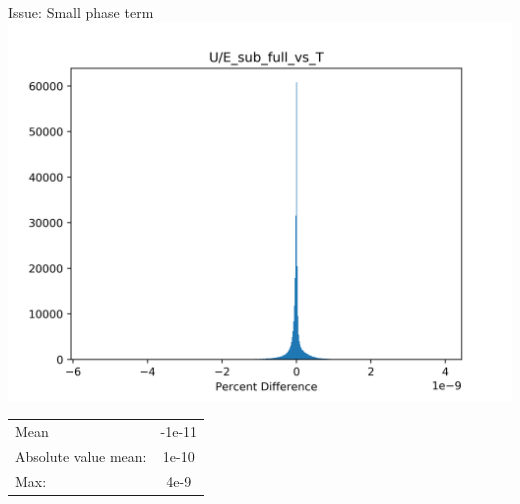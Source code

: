 \documentclass[presentation]{beamer}
\begin{document}
  \begin{frame}{Issue: Small phase term}
    \centering
    \includegraphics[width=0.8\linewidth]{figs/esub}

    \begin{tabular}{l | c }
    Mean & -1e-11\\
    Absolute value mean: & 1e-10\\
    Max: & 4e-9\\
  \end{tabular}  

    
  \end{frame}
\end{document}
